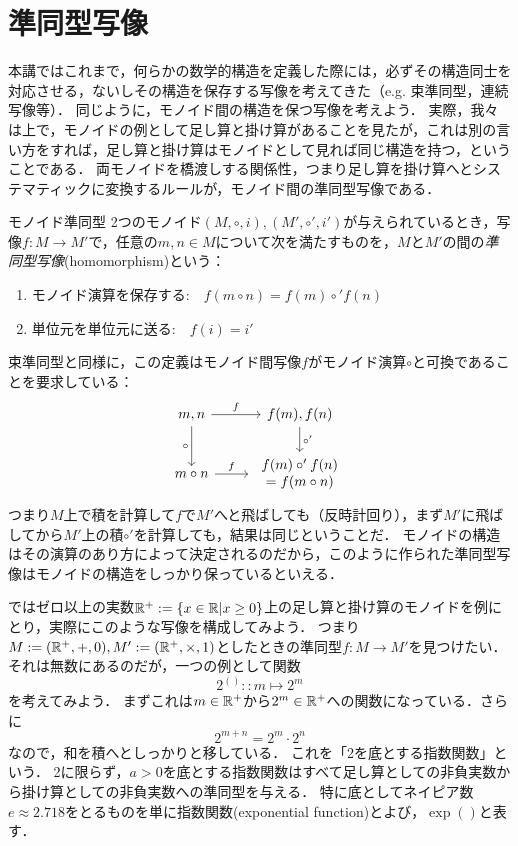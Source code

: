 \documentclass[11pt,a4paper, dvipdfmx]{jsarticle}
\begin{document}
\section{準同型写像}
本講ではこれまで，何らかの数学的構造を定義した際には，必ずその構造同士を対応させる，ないしその構造を保存する写像を考えてきた（e.g. 束準同型，連続写像等）．
同じように，モノイド間の構造を保つ写像を考えよう．
実際，我々は上で，モノイドの例として足し算と掛け算があることを見たが，これは別の言い方をすれば，足し算と掛け算はモノイドとして見れば同じ構造を持つ，ということである．
両モノイドを橋渡しする関係性，つまり足し算を掛け算へとシステマティックに変換するルールが，モノイド間の準同型写像である．

\begin{dfn}{モノイド準同型}{}
    2つのモノイド$(M, \circ, i), (M', \circ', i')$が与えられているとき，写像$f:M \to M'$で，任意の$m,n \in M$について次を満たすものを，$M$と$M'$の間の\emph{準同型写像}(homomorphism)という：
    \begin{enumerate}
        \item モノイド演算を保存する: $\ \ \ f(m \circ n) = f(m) \circ' f(n)$
        \item 単位元を単位元に送る: $\ \ \ f(i) = i'$
    \end{enumerate}
\end{dfn}

束準同型と同様に，この定義はモノイド間写像$f$がモノイド演算$\circ$と可換であることを要求している：
\[
\begin{tikzcd}
m, n \arrow{r}{f} \arrow[swap]{d}{\circ} 
& f(m), f(n) \arrow{d}{\circ'} \\
m \circ n \arrow{r}{f} 
& \begin{array}{c} f(m) \circ' f(n) \\ = f(m \circ n) \end{array}
\end{tikzcd}
\]
つまり$M$上で積を計算して$f$で$M'$へと飛ばしても（反時計回り），まず$M'$に飛ばしてから$M'$上の積$\circ'$を計算しても，結果は同じということだ．
モノイドの構造はその演算のあり方によって決定されるのだから，このように作られた準同型写像はモノイドの構造をしっかり保っているといえる．

ではゼロ以上の実数$\mathbb{R}^+ := \{x \in \mathbb{R} | x \geq 0 \}$上の足し算と掛け算のモノイドを例にとり，実際にこのような写像を構成してみよう．
つまり$M := (\mathbb{R}^+, +, 0), M' := (\mathbb{R}^+, \times, 1)$としたときの準同型$f:M \to M'$を見つけたい．
それは無数にあるのだが，一つの例として関数
\[ 2^{()} :: m \mapsto 2^m \]
を考えてみよう．
まずこれは$m \in \mathbb{R}^+$から$2^m \in \mathbb{R}^+$への関数になっている．さらに
\[ 2^{m + n} = 2^m \cdot 2^n \]
なので，和を積へとしっかりと移している．
これを「2を底とする指数関数」という．
2に限らず，$a>0$を底とする指数関数はすべて足し算としての非負実数から掛け算としての非負実数への準同型を与える．
特に底としてネイピア数$e\approx 2.718$をとるものを単に指数関数(exponential function)とよび，$\exp()$と表す．
\end{document}
